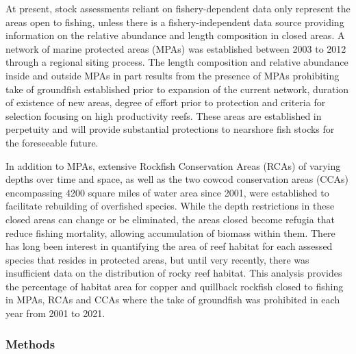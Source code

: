 \documentclass[11pt,
  english,
  a4paper,
]{article}
\begin{document}
\leavevmode\tagmcend\tagstructend


At present, stock assessments reliant on fishery-dependent data only represent the areas open to fishing, unless there is a fishery-independent data source providing information on the relative abundance and length composition in closed areas. A network of marine protected areas (MPAs) was established between 2003 to 2012 through a regional siting process. The length composition and relative abundance inside and outside MPAs in part results from the presence of MPAs prohibiting take of groundfish established prior to expansion of the current network, duration of existence of new areas, degree of effort prior to protection and criteria for selection focusing on high productivity reefs. These areas are established in perpetuity and will provide substantial protections to nearshore fish stocks for the foreseeable future.

\leavevmode\tagmcend\tagstructend\par


In addition to MPAs, extensive Rockfish Conservation Areas (RCAs) of varying depths over time and space, as well as the two cowcod conservation areas (CCAs) encompassing 4200 square miles of water area since 2001, were established to facilitate rebuilding of overfished species. While the depth restrictions in these closed areas can change or be eliminated, the areas closed become refugia that reduce fishing mortality, allowing accumulation of biomass within them. There has long been interest in quantifying the area of reef habitat for each assessed species that resides in protected areas, but until very recently, there was insufficient data on the distribution of rocky reef habitat. This analysis provides the percentage of habitat area for copper and quillback rockfish closed to fishing in MPAs, RCAs and CCAs where the take of groundfish was prohibited in each year from 2001 to 2021.

\leavevmode\tagmcend\tagstructend\par


\hypertarget{methods}{%
\subsubsection{Methods}\label{methods}}
\end{document}
